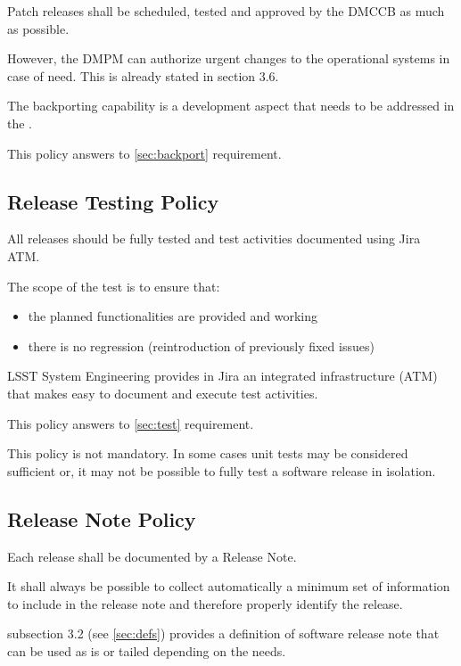 Patch releases shall be scheduled, tested and approved by the DMCCB as much as possible.

However, the DMPM can authorize urgent changes to the operational systems in case of need. 
This is already stated in  section 3.6.

The backporting capability is a development aspect that needs to be addressed in the .

This policy answers to \ref{sec:backport} requirement.


\subsection{Release Testing Policy} \label{sec:testpolicy}

All releases should be fully tested and test activities documented using Jira ATM.

The scope of the test is to ensure that:

\begin{itemize}
\item the planned functionalities are provided and working
\item there is no regression (reintroduction of previously fixed issues)
\end{itemize}

LSST System Engineering provides in Jira an integrated infrastructure (ATM) that makes easy to document and execute test activities.

This policy answers to \ref{sec:test} requirement.

This policy is not mandatory.
In some cases unit tests may be considered sufficient or, it may not be possible to fully test a software release in isolation.


\subsection{Release Note Policy} \label{sec:notepolicy}

Each release shall be documented by a Release Note.

It shall always be possible to collect automatically a minimum set of information to include in the release note and therefore properly identify the release.

 subsection 3.2 (see \ref{sec:defs}) provides a definition of software release note that can be used as is or tailed depending on the needs.

